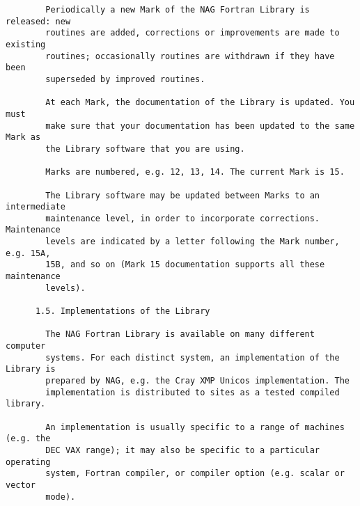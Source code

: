 \begin{small}
\begin{verbatim}
        Periodically a new Mark of the NAG Fortran Library is released: new       
        routines are added, corrections or improvements are made to existing      
        routines; occasionally routines are withdrawn if they have been           
        superseded by improved routines.                                          
                                                                                  
        At each Mark, the documentation of the Library is updated. You must       
        make sure that your documentation has been updated to the same Mark as    
        the Library software that you are using.                                  
                                                                                  
        Marks are numbered, e.g. 12, 13, 14. The current Mark is 15.              
                                                                                  
        The Library software may be updated between Marks to an intermediate      
        maintenance level, in order to incorporate corrections. Maintenance       
        levels are indicated by a letter following the Mark number, e.g. 15A,     
        15B, and so on (Mark 15 documentation supports all these maintenance      
        levels).                                                                  
                                                                                  
      1.5. Implementations of the Library                                         
                                                                                  
        The NAG Fortran Library is available on many different computer           
        systems. For each distinct system, an implementation of the Library is    
        prepared by NAG, e.g. the Cray XMP Unicos implementation. The             
        implementation is distributed to sites as a tested compiled library.      
                                                                                  
        An implementation is usually specific to a range of machines (e.g. the    
        DEC VAX range); it may also be specific to a particular operating         
        system, Fortran compiler, or compiler option (e.g. scalar or vector       
        mode).                                                                    
                                                                                  

\end{verbatim}
\end{small}
